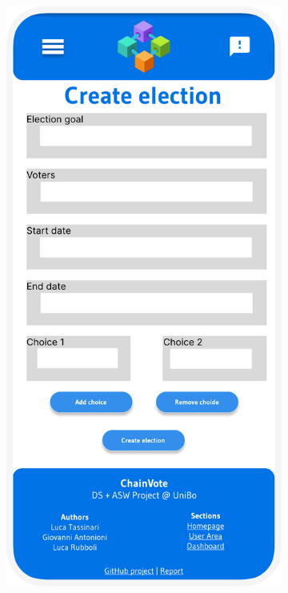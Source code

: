 \documentclass{scrartcl}
\begin{document}
\begin{figure}
\begin{subfigure}[b]{0.3\textwidth}
    \end{subfigure}
    \hfill
    \begin{subfigure}[b]{0.3\textwidth}
        \centering
        \includegraphics[width=\textwidth]{./figures/mockups/create-election.pdf}

\end{subfigure}
\end{figure}
\end{document}
